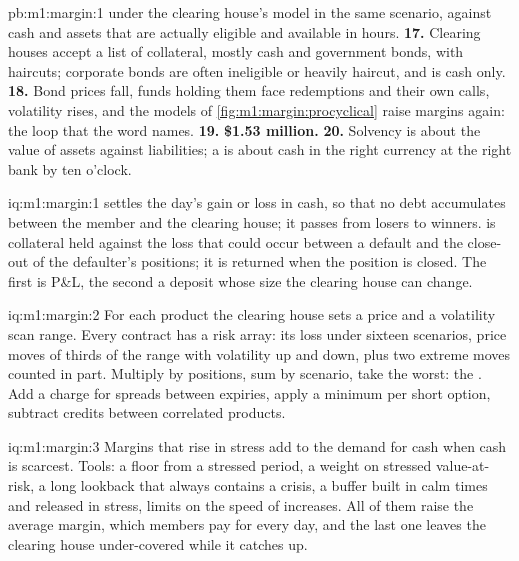 \begin{solution}{pb:m1:margin:1}
 under the clearing house's model in the same scenario,
against cash and assets that are actually eligible and available in hours.
\textbf{17.} Clearing houses accept a list of collateral, mostly cash and
government bonds, with haircuts; corporate bonds are often ineligible or
heavily haircut, and  is cash only.
\textbf{18.} Bond prices fall, funds holding them face redemptions and their
own calls, volatility rises, and the models of
\cref{fig:m1:margin:procyclical} raise margins again: the loop that the
word  names.
\textbf{19.} \textbf{\$1.53 million.}
\textbf{20.} Solvency is about the value of assets against liabilities;
a  is about cash in the right currency at the right bank by ten
o'clock.
\end{solution}

\begin{solution}{iq:m1:margin:1}
 settles the day's gain or loss in cash, so that no debt
accumulates between the member and the clearing house; it passes from losers
to winners.  is collateral held against the loss that could
occur between a default and the close-out of the defaulter's positions; it
is returned when the position is closed. The first is P\&L, the second a
deposit whose size the clearing house can change.
\end{solution}

\begin{solution}{iq:m1:margin:2}
For each product the clearing house sets a price and a volatility scan
range. Every contract has a risk array: its loss under sixteen scenarios,
price moves of thirds of the range with volatility up and down, plus two
extreme moves counted in part. Multiply by positions, sum by scenario, take
the worst: the . Add a charge for spreads between expiries, apply a
minimum per short option, subtract credits between correlated products.
\end{solution}

\begin{solution}{iq:m1:margin:3}
Margins that rise in stress add to the demand for cash when cash is
scarcest. Tools: a floor from a stressed period, a weight on stressed
value-at-risk, a long lookback that always contains a crisis, a buffer built
in calm times and released in stress, limits on the speed of increases. All
of them raise the average margin, which members pay for every day, and the
last one leaves the clearing house under-covered while it catches up.
\end{solution}

